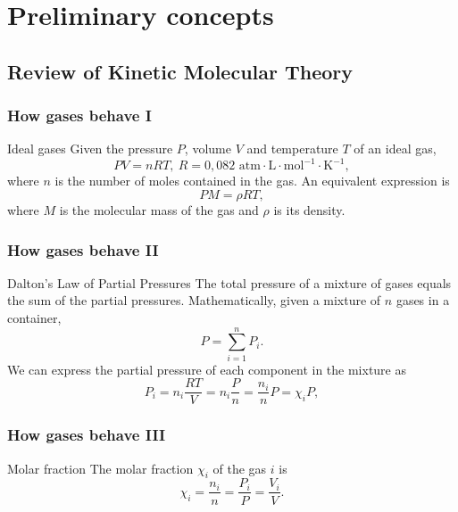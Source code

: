 \documentclass{beamer}
\begin{document}
\section{Preliminary concepts}


\subsection{Review of Kinetic Molecular Theory}


\begin{frame}
\frametitle{How gases behave I}
\begin{block}{Ideal gases}
Given the pressure $P$, volume $V$ and temperature $T$ of an ideal gas,
\begin{equation*}
PV=nRT, \ R=0,082 \text{ atm}\cdot\text{L}\cdot\text{mol}^{-1}\cdot\text{K}^{-1},
\end{equation*}
where $n$ is the number of moles contained in the gas. An equivalent expression is
\begin{equation*}
PM=\rho RT,
\end{equation*}
where $M$ is the molecular mass of the gas and $\rho$ is its density.
\end{block}
\end{frame}


\begin{frame}
\frametitle{How gases behave II}
\begin{block}{Dalton's Law of Partial Pressures}
The total pressure of a mixture of gases equals the sum of the partial pressures. Mathematically, given a mixture of $n$ gases in a container,
\begin{equation*}
P = \sum_{i = 1}^n P_i.
\end{equation*}
We can express the partial pressure of each component in the mixture as
\begin{equation*}
P_i = n_i\frac{RT}{V} = n_i\frac{P}{n} = \frac{n_i}{n}P = \chi_i P,
\end{equation*}
\end{block}
\end{frame}


\begin{frame}
\frametitle{How gases behave III}
\begin{block}{Molar fraction}
The molar fraction $\chi_i$ of the gas $i$ is
\begin{equation*}
\chi_i = \frac{n_i}{n} = \frac{P_i}{P} = \frac{V_i}{V}.
\end{equation*}
\end{block}
\end{frame}
\end{document}
